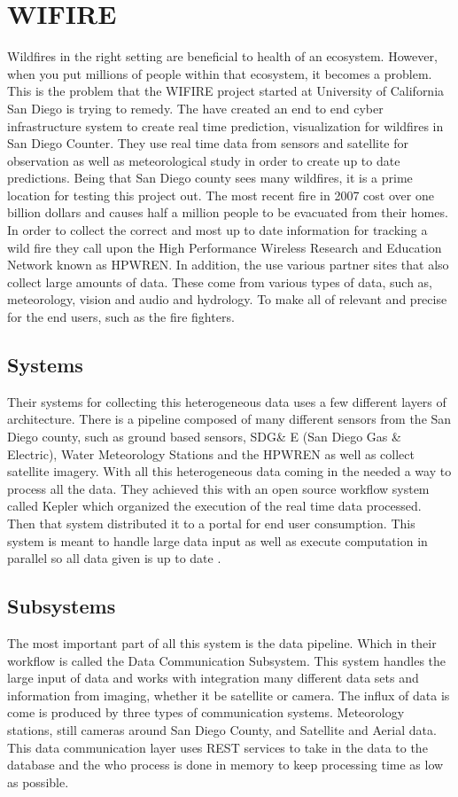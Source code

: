 \documentclass[sigconf]{acmart}
\begin{document}
\section{WIFIRE}
Wildfires in the right setting are beneficial to health of an 
ecosystem.  However, when you put millions of people within that 
ecosystem, it becomes a problem.  This is the problem that the WIFIRE 
project started at University of California San Diego is trying to 
remedy.   The have created an end to end cyber infrastructure system to 
create real time prediction, visualization for wildfires in San Diego 
Counter. They use real time data from sensors and satellite for 
observation as well as meteorological study in order to create up to 
date predictions.  Being that San Diego county sees many wildfires, it 
is a prime location for testing this project out.  The most recent fire 
in 2007 cost over one billion dollars and causes half a million people 
to be evacuated from their homes\citep{NPR}. In order to collect the 
correct and most up to date information for tracking a wild fire they 
call upon the High Performance Wireless Research and Education Network 
known as HPWREN.  In addition, the use various partner sites that also 
collect large amounts of data.  These come from various types of data, 
such as, meteorology, vision and audio and hydrology.   To make all of 
relevant and precise for the end users, such as the fire fighters.
\subsection{Systems}
Their systems for collecting this heterogeneous data uses a few 
different layers of architecture. There is a pipeline composed of many 
different sensors from the San Diego county, such as ground based 
sensors, SDG\& E (San Diego Gas \& Electric), Water Meteorology 
Stations and the HPWREN as well as collect satellite imagery.  With all 
this heterogeneous data coming in the needed a way to process all the 
data.  They achieved this with  an open source workflow system called 
Kepler which organized the execution of the real time data processed.  
Then that system distributed it to a portal for end user consumption.  
This system is meant to handle large data input as well as execute 
computation in parallel so all data given is up to date 
\cite{ALTINTAS}.
\subsection{Subsystems}
The most important part of all this system is the data pipeline.  Which 
in their workflow is called the Data Communication Subsystem.  This 
system handles the large input of data and works with integration many 
different data sets and information from imaging, whether it be 
satellite or camera.  The influx of data is come is produced by three 
types of communication systems.  Meteorology stations, still cameras 
around San Diego County, and Satellite and Aerial data.  This data 
communication layer uses REST services to take in the data to the 
database and the who process is done in memory to keep processing time 
as low as possible.
\end{document}
